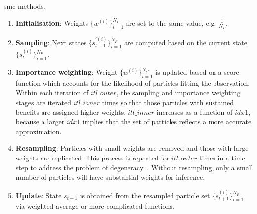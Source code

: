 \begin{algorithm}
\caption{\gls{smc} methods.}
\begin{algorithmic}[1]
			 \label{algo:s}
			 \label{algo:i}
		\ENDWHILE
	\ENDFOR
	\ENDIF
\ENDWHILE
{}
\ENDFOR
\end{algorithmic}
\label{algo:smc_bg}
\end{algorithm}

\begin{enumerate}
\item \textbf{Initialisation}: Weights $\{w^{(i)}\}^{N_P}_{i=1}$ are set to the same value, e.g. $\frac{1}{N_P}$.
\item \textbf{Sampling}: Next states $\{s_{t+1}^{\prime(i)}\}^{N_P}_{i=1}$ are computed based on the current state $\{s_{t}^{(i)}\}^{N_P}_{i=1}$.
\item \textbf{Importance weighting}: Weight $\{w^{(i)}\}^{N_P}_{i=1}$ is updated based on a score function which accounts for the likelihood of particles fitting the observation.
Within each iteration of $itl\_outer$, the sampling and importance weighting stages are iterated $itl\_inner$ times so that those particles with sustained benefits are assigned higher weights.
$itl\_inner$ increases as a function of $idx1$, because a larger $idx1$ implies that the set of particles reflects a more accurate approximation.
\item \textbf{Resampling}: Particles with small weights are removed and those with large weights are replicated.
This process is repeated for $itl\_outer$ times in a time step to address the problem of degeneracy~\cite{kitagawa96}.
Without resampling, only a small number of particles will have substantial weights for inference.
\item \textbf{Update}: State $s_{t+1}$ is obtained from the resampled particle set $\{s_{t+1}^{(i)}\}^{N_P}_{i=1}$ via weighted average or more complicated functions.
\end{enumerate}

